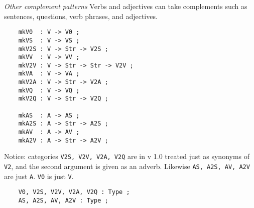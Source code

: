 \documentclass[11pt,a4paper]{article}
\newcommand{\subsubsubsection}[1]{\textit{#1}}
\begin{document}
\subsubsubsection{Other complement patterns}
Verbs and adjectives can take complements such as sentences,
questions, verb phrases, and adjectives.

\begin{verbatim}
    mkV0  : V -> V0 ;
    mkVS  : V -> VS ;
    mkV2S : V -> Str -> V2S ;
    mkVV  : V -> VV ;
    mkV2V : V -> Str -> Str -> V2V ;
    mkVA  : V -> VA ;
    mkV2A : V -> Str -> V2A ;
    mkVQ  : V -> VQ ;
    mkV2Q : V -> Str -> V2Q ;
  
    mkAS  : A -> AS ;
    mkA2S : A -> Str -> A2S ;
    mkAV  : A -> AV ;
    mkA2V : A -> Str -> A2V ;
\end{verbatim}

Notice: categories \texttt{V2S, V2V, V2A, V2Q} are in v 1.0 treated
just as synonyms of \texttt{V2}, and the second argument is given
as an adverb. Likewise \texttt{AS, A2S, AV, A2V} are just \texttt{A}.
\texttt{V0} is just \texttt{V}.

\begin{verbatim}
    V0, V2S, V2V, V2A, V2Q : Type ;
    AS, A2S, AV, A2V : Type ;
\end{verbatim}
\end{document}
